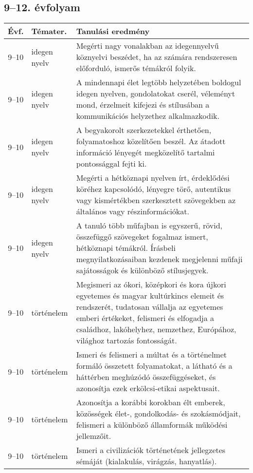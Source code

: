 \subsection{9--12. évfolyam}
\begin{small}
  \begin{longtable}{c | p{2cm} |  p{11cm} }
    \textbf{Évf.} & \textbf{Témater.} & \textbf{Tanulási eredmény} \\ \hline \hline
    \endhead

              9--10 & idegen nyelv & Megérti nagy vonalakban az idegennyelvű köznyelvi beszédet, ha az számára rendszeresen előforduló, ismerős témákról folyik. \\ \hline
              9--10 & idegen nyelv & A mindennapi élet legtöbb helyzetében boldogul idegen nyelven, gondolatokat cserél, véleményt mond, érzelmeit kifejezi és stílusában a kommunikációs helyzethez alkalmazkodik. \\ \hline
              9--10 & idegen nyelv & A begyakorolt szerkezetekkel érthetően, folyamatoshoz közelítően beszél. Az átadott információ lényegét megközelítő tartalmi pontossággal fejti ki. \\ \hline
              9--10 & idegen nyelv & Megérti a hétköznapi nyelven írt, érdeklődési köréhez kapcsolódó, lényegre törő, autentikus vagy kismértékben szerkesztett szövegekben az általános vagy részinformációkat. \\ \hline
              9--10 & idegen nyelv & A tanuló több műfajban is egyszerű, rövid, összefüggő szövegeket fogalmaz ismert, hétköznapi témákról. Írásbeli megnyilatkozásaiban kezdenek megjelenni műfaji sajátosságok és különböző stílusjegyek. \\ \hline
              9--10 & történelem & Megismeri az ókori, középkori és kora újkori egyetemes és magyar kultúrkincs elemeit és rendszerét, tudatosan vállalja az egyetemes emberi értékeket, felismeri és elfogadja a családhoz, lakóhelyhez, nemzethez, Európához, világhoz tartozás fontosságát. \\ \hline
              9--10 & történelem & Ismeri és felismeri a múltat és a történelmet formáló összetett folyamatokat, a látható és a háttérben meghúzódó összefüggéseket, és azonosítja ezek erkölcsi-etikai aspektusait. \\ \hline
              9--10 & történelem & Azonosítja a korábbi korokban élt emberek, közösségek élet-, gondolkodás- és szokásmódjait, felismeri a különböző államformák működési jellemzőit. \\ \hline
              9--10 & történelem & Ismeri a civilizációk történetének jellegzetes sémáját (kialakulás, virágzás, hanyatlás). \\ \hline

\end{longtable}
\end{small}
